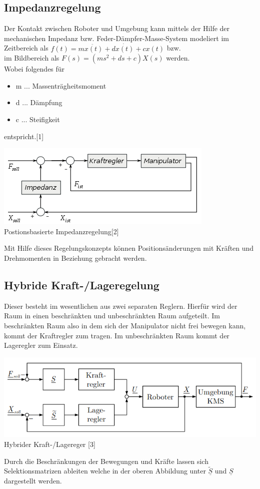 \documentclass[12pt]{article}
\begin{document}
\subsection{Impedanzregelung}
Der Kontakt zwischen Roboter und Umgebung kann mittels der Hilfe der mechanischen Impedanz bzw. Feder-Dämpfer-Masse-System modeliert im Zeitbereich als
$f(t) = m \ddot{x(t)} + d \dot{x(t)} + c x(t)$ bzw.\\ im Bildbereich als $F(s) = (ms^2 + ds + c) X(s)$ werden.\\ Wobei folgendes für
\begin{itemize}
\item m ... Massenträgheitsmoment
\item d ... Dämpfung
\item c ... Steifigkeit
\end{itemize}
entspricht.[1]
\begin{center}
\includegraphics[scale=0.8]{img/Impedanzregler}\\
Postionsbasierte Impedanzregelung[2]
\end{center}
Mit Hilfe dieses Regelungskonzepts können Positionsänderungen mit Kräften und Drehmomenten in Beziehung gebracht werden.   


\subsection{Hybride Kraft-/Lageregelung}
Dieser besteht im wesentlichen aus zwei separaten Reglern. Hierfür wird der Raum in einen beschränkten und unbeschränkten Raum aufgeteilt. Im beschränkten Raum also in dem sich der Manipulator nicht frei bewegen kann, kommt der Kraftregler zum tragen. Im unbeschränkten Raum kommt der Lageregler zum Einsatz.
\begin{center}
\includegraphics[scale=0.65]{img/Hybride_Kraft_Lageregelung}
Hybrider Kraft-/Lagereger [3]
\end{center}
Durch die Beschränkungen der Bewegungen und Kräfte lassen sich Selektionsmatrizen ableiten welche in der oberen Abbildung unter $\widetilde{\underline{S}}$ und $\underline{S}$ dargestellt werden.
\end{document}
